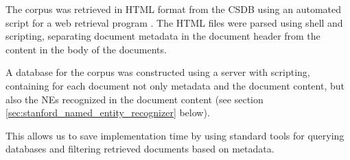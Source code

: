 The corpus was retrieved in HTML format from the CSDB using an automated script for a web retrieval program \cite{wget}. The HTML files were parsed using shell and \citeauthor{python} scripting, separating document metadata in the document header from the content in the body of the documents.

A database for the corpus was constructed using a \citeauthor{MySQL} server with \citeauthor{perl} scripting, containing for each document not only metadata and the document content, but also the NEs recognized in the document content (see section \ref{sec:stanford_named_entity_recognizer} below).

This allows us to save implementation time by using standard tools for querying databases and filtering retrieved documents based on metadata. 
